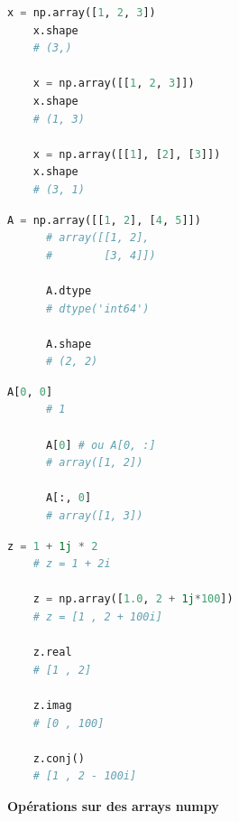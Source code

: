 \documentclass[aspectratio=169]{beamer}
\begin{document}
\begin{frame}[fragile]{}{}
  \vfill
  \begin{lstlisting}[language=Python]
    x = np.array([1, 2, 3])
    x.shape
    # (3,)

    x = np.array([[1, 2, 3]])
    x.shape
    # (1, 3)

    x = np.array([[1], [2], [3]])
    x.shape
    # (3, 1)
  \end{lstlisting}
  \vfill
\end{frame}





\begin{frame}[fragile]{}{}
  \vfill
  \begin{minipage}{.60\textwidth}
    \begin{lstlisting}[language=Python]
      A = np.array([[1, 2], [4, 5]])
      # array([[1, 2],
      #        [3, 4]])
      
      A.dtype
      # dtype('int64')
      
      A.shape
      # (2, 2)
    \end{lstlisting}
  \end{minipage}%
  \hfill
  \begin{minipage}{.36\textwidth}
    \begin{lstlisting}[language=Python]
      A[0, 0]
      # 1

      A[0] # ou A[0, :]
      # array([1, 2])

      A[:, 0]
      # array([1, 3])
    \end{lstlisting}
  \end{minipage}
  \vfill
\end{frame}




\begin{frame}[fragile]{}{}
  \vfill
  \begin{lstlisting}[language=Python]
    z = 1 + 1j * 2
    # z = 1 + 2i

    z = np.array([1.0, 2 + 1j*100])
    # z = [1 , 2 + 100i]

    z.real
    # [1 , 2]

    z.imag
    # [0 , 100]

    z.conj()
    # [1 , 2 - 100i]
  \end{lstlisting}
  \vfill
\end{frame}




\begin{frame}
  \vfill
  \centering
  \textbf{Opérations sur des arrays numpy}
  \vfill
\end{frame}
\end{document}
